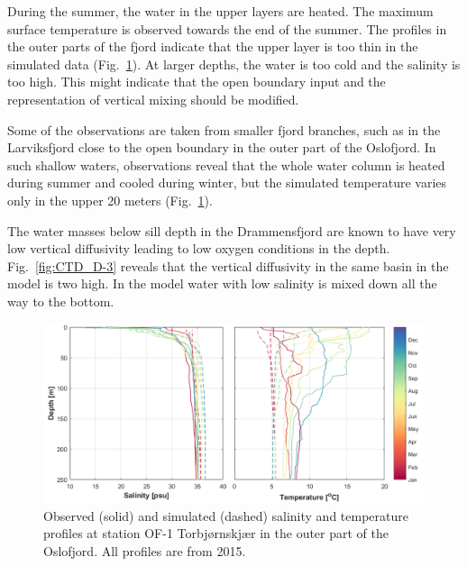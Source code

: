 During the summer, the water in the upper layers are heated. 
The maximum surface temperature is observed towards the end of the summer. 
The profiles in the outer parts of the fjord indicate that the upper layer is too thin in the simulated data (Fig.~\ref{fig:CTD_OF-1}). 
At larger depths, the water is too cold and the salinity is too high. 
This might indicate that the open boundary input and the representation of vertical mixing should be modified. 

Some of the observations are taken from smaller fjord branches, such as in the Larviksfjord close to the open boundary in the outer part of the Oslofjord. 
In such shallow waters, observations reveal that the whole water column is heated during summer and cooled during winter, but the simulated temperature varies only in the upper 20 meters (Fig.~\ref{fig:CTD_OF-1}). 

The water masses below sill depth in the Drammensfjord are known to have very low vertical diffusivity leading to low oxygen conditions in the depth.
Fig.~\ref{fig:CTD_D-3} reveals that the vertical diffusivity in the same basin in the model is two high.
In the model water with low salinity is mixed down all the way to the bottom. 


\begin{figure}[tbh]
\centerline{
\includegraphics*[trim=0cm 0cm 0cm 0cm,clip=true,width=\textwidth]{Figurer/CTD_OF-1}}
\caption{\small
Observed (solid) and simulated (dashed) salinity and temperature profiles at station OF-1 Torbj{\o}rnskj{\ae}r in the outer part of the Oslofjord. All profiles are from 2015.}
\label{fig:CTD_OF-1}
\end{figure}

